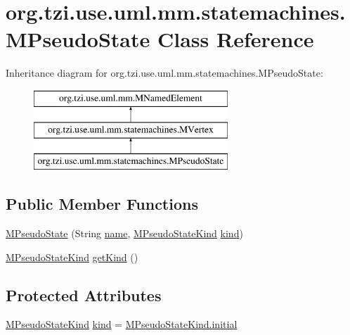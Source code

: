 \hypertarget{classorg_1_1tzi_1_1use_1_1uml_1_1mm_1_1statemachines_1_1_m_pseudo_state}{\section{org.\-tzi.\-use.\-uml.\-mm.\-statemachines.\-M\-Pseudo\-State Class Reference}
\label{classorg_1_1tzi_1_1use_1_1uml_1_1mm_1_1statemachines_1_1_m_pseudo_state}
}
Inheritance diagram for org.\-tzi.\-use.\-uml.\-mm.\-statemachines.\-M\-Pseudo\-State\-:\begin{figure}[H]
\begin{center}
\leavevmode
\includegraphics[height=3.000000cm]{classorg_1_1tzi_1_1use_1_1uml_1_1mm_1_1statemachines_1_1_m_pseudo_state}
\end{center}
\end{figure}
\subsection*{Public Member Functions}
\begin{DoxyCompactItemize}
\item 
\hyperlink{classorg_1_1tzi_1_1use_1_1uml_1_1mm_1_1statemachines_1_1_m_pseudo_state_a8b8178aefa0c370fb258175a5388ebc3}{M\-Pseudo\-State} (String \hyperlink{classorg_1_1tzi_1_1use_1_1uml_1_1mm_1_1statemachines_1_1_m_vertex_a9bb884a76140732039ff1fbf631b6575}{name}, \hyperlink{enumorg_1_1tzi_1_1use_1_1uml_1_1mm_1_1statemachines_1_1_m_pseudo_state_kind}{M\-Pseudo\-State\-Kind} \hyperlink{classorg_1_1tzi_1_1use_1_1uml_1_1mm_1_1statemachines_1_1_m_pseudo_state_ab46d76947c00de0429e5cd43e04097b6}{kind})
\item 
\hyperlink{enumorg_1_1tzi_1_1use_1_1uml_1_1mm_1_1statemachines_1_1_m_pseudo_state_kind}{M\-Pseudo\-State\-Kind} \hyperlink{classorg_1_1tzi_1_1use_1_1uml_1_1mm_1_1statemachines_1_1_m_pseudo_state_a59c3ee814f5e00ba649c17a617b0136a}{get\-Kind} ()
\end{DoxyCompactItemize}
\subsection*{Protected Attributes}
\begin{DoxyCompactItemize}
\item 
\hyperlink{enumorg_1_1tzi_1_1use_1_1uml_1_1mm_1_1statemachines_1_1_m_pseudo_state_kind}{M\-Pseudo\-State\-Kind} \hyperlink{classorg_1_1tzi_1_1use_1_1uml_1_1mm_1_1statemachines_1_1_m_pseudo_state_ab46d76947c00de0429e5cd43e04097b6}{kind} = \hyperlink{enumorg_1_1tzi_1_1use_1_1uml_1_1mm_1_1statemachines_1_1_m_pseudo_state_kind_a42dff4eeb6b82cadd299534ef165e3ae}{M\-Pseudo\-State\-Kind.\-initial}
\end{DoxyCompactItemize}


